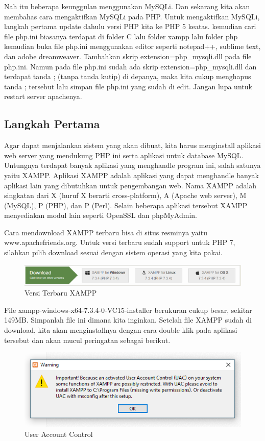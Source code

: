 Nah itu beberapa keunggulan menggunakan MySQLi. Dan sekarang kita akan membahas cara mengaktifkan MySQLi pada PHP.
Untuk mengaktifkan MySQLi, langkah pertama update dahulu versi PHP kita ke PHP 5 keatas. kemudian cari file php.ini biasanya terdapat di folder C lalu folder xampp lalu folder php kemudian buka file php.ini menggunakan editor seperti notepad++, sublime text, dan adobe dreamweaver. Tambahkan skrip extension=php\_mysqli.dll pada file php.ini. Namun pada file php.ini sudah ada skrip extension=php\_mysqli.dll dan terdapat tanda ; (tanpa tanda kutip) di depanya, maka kita cukup menghapus tanda ; tersebut lalu simpan file php.ini yang sudah di edit. Jangan lupa untuk restart server apachenya.

\subsection{Langkah Pertama}
Agar dapat menjalankan sistem yang akan dibuat, kita harus menginstall aplikasi web server yang mendukung PHP ini serta aplikasi untuk database MySQL. Untungnya terdapat banyak aplikasi yang menghandle program ini, salah satunya yaitu XAMPP. Aplikasi XAMPP adalah aplikasi yang dapat menghandle banyak aplikasi lain yang dibutuhkan untuk pengembangan web. Nama XAMPP adalah singkatan dari X (huruf X berarti cross-platform), A (Apache web server), M (MySQL), P (PHP), dan P (Perl). Selain beberapa aplikasi tersebut XAMPP menyediakan modul lain seperti OpenSSL dan phpMyAdmin.
\par
Cara mendownload XAMPP terbaru bisa di situs resminya yaitu www.apachefriends.org. Untuk versi terbaru sudah support untuk PHP 7, silahkan pilih download sesuai dengan sistem operasi yang kita pakai.

\begin{figure}[h]
\centering
\includegraphics[scale=0.5]{figures/xampp}
\caption{Versi Terbaru XAMPP}
\end{figure}

File xampp-windows-x64-7.3.4-0-VC15-installer berukuran cukup besar, sekitar 149MB. Simpanlah file ini dimana kita inginkan.
Setelah file XAMPP sudah di download, kita akan menginstallnya dengan cara double klik pada aplikasi tersebut dan akan mucul peringatan sebagai berikut.

 \begin{figure}[h]
\centering
\includegraphics[scale=0.5]{figures/uac}
\caption{User Account Control}
\end{figure}

